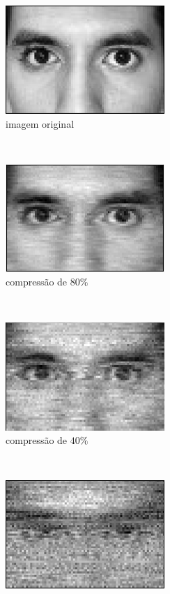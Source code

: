\begin{figure}
\centering
	\begin{subfigure}[b]{0.4\textwidth}
        \centering
        \includegraphics[scale=1]{imagens/homotopy/original.png}
        \caption{imagem original}
	    \label{fig:homotopy_original}
    \end{subfigure}
    ~
    \begin{subfigure}[b]{0.4\textwidth}
        \centering
        \includegraphics[scale=1]{imagens/homotopy/80porcento.png}
        \caption{compressão de $80\%$}
	    \label{fig:homotopy_20porc}
    \end{subfigure}\\    
    \begin{subfigure}[b]{0.4\textwidth}
        \centering
        \includegraphics[scale=1]{imagens/homotopy/40porcento.png}
        \caption{compressão de $40\%$}
	    \label{fig:homotopy_40porc}
    \end{subfigure}
    ~
    \begin{subfigure}[b]{0.4\textwidth}
        \centering
        \includegraphics[scale=1]{imagens/homotopy/20porcento.png}

\end{subfigure}
\end{figure}
